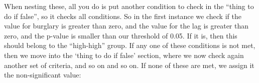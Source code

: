 \documentclass[]{book}
\newenvironment{Shaded}{\begin{snugshade}}{\end{snugshade}}
\newcommand{\DecValTok}[1]{\textcolor[rgb]{0.00,0.00,0.81}{#1}}
\newcommand{\KeywordTok}[1]{\textcolor[rgb]{0.13,0.29,0.53}{\textbf{#1}}}
\newcommand{\NormalTok}[1]{#1}
\newcommand{\OperatorTok}[1]{\textcolor[rgb]{0.81,0.36,0.00}{\textbf{#1}}}
\newcommand{\StringTok}[1]{\textcolor[rgb]{0.31,0.60,0.02}{#1}}
\begin{document}
\begin{Shaded}
\end{Shaded}

When nesting these, all you do is put another condition to check in the ``thing to do if false'', so it checks all conditions. So in the first instance we check if the value for burglary is greater than zero, and the value for the lag is greater than zero, and the p-value is smaller than our threshold of 0.05. If it is, then this should belong to the ``high-high'' group. If any one of these conditions is not met, then we move into the `thing to do if false' section, where we now check again another set of criteria, and so on and so on. If none of these are met, we assign it the non-significant value:
\end{document}
